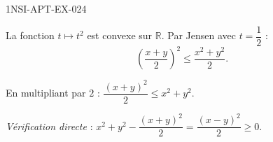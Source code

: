 \begin{corrige}{1NSI-APT-EX-024}

La fonction $t \mapsto t^2$ est convexe sur $\mathbb{R}$. Par Jensen avec $t = \dfrac{1}{2}$ :
\[ \left(\frac{x+y}{2}\right)^2 \leq \frac{x^2 + y^2}{2}. \]


En multipliant par $2$ : $\dfrac{(x+y)^2}{2} \leq x^2 + y^2$.

\emph{Vérification directe} : $x^2 + y^2 - \dfrac{(x+y)^2}{2} = \dfrac{(x-y)^2}{2} \geq 0$.

\end{corrige}
